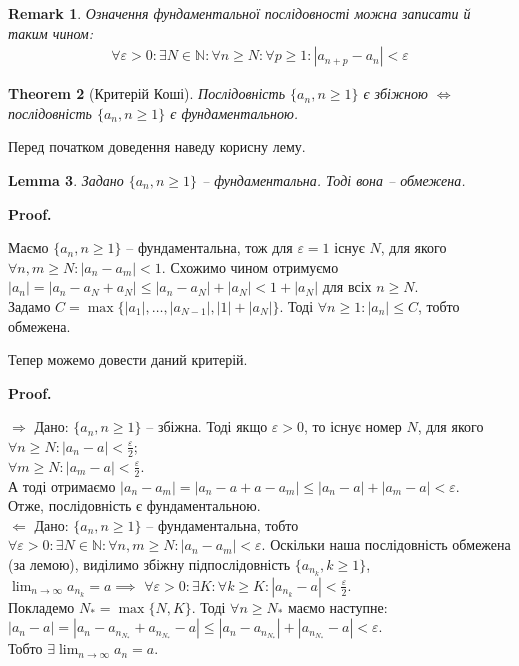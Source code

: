 \documentclass[a4paper, 14pt]{article}
\makeatletter
\def\qed{$\blacksquare$}
\def\rightproof{$\boxed{\Rightarrow}$ }
\def\leftproof{$\boxed{\Leftarrow}$ }
\theoremstyle{theoremdd}
\newtheorem{theorem}{Theorem}[subsection]
\theoremstyle{theoremdd}
\theoremstyle{theoremdd}
\theoremstyle{theoremdd}
\theoremstyle{theoremdd}
\theoremstyle{theoremdd}
\newtheorem{remark}[theorem]{Remark}
\theoremstyle{theoremdd}
\newtheorem{lemma}[theorem]{Lemma}
\theoremstyle{theoremdd}
\renewenvironment{proof}[1][Proof.\\]{\par
\pushQED{\hfill \qed}%
\normalfont \topsep6\p@\@plus6\p@\relax
\trivlist
\item\relax
{\bfseries
#1\@addpunct{.}}\hspace\labelsep\ignorespaces
}{%
\popQED\endtrivlist\@endpefalse
}
\makeatother
\begin{document}
	\begin{remark}
	Означення фундаментальної послідовності можна записати й таким чином:
	\begin{align*}
	\forall \varepsilon > 0: \exists N \in \mathbb{N}: \forall n \geq N: \forall p \geq 1: |a_{n+p} - a_n| < \varepsilon
	\end{align*}
	\end{remark}
	
	\begin{theorem}[Критерій Коші]
	Послідовність $\{a_n, n \geq 1\}$ є збіжною $\iff$ послідовність $\{a_n, n \geq 1\}$ є фундаментальною.
	\end{theorem}
	
	Перед початком доведення наведу корисну лему.
	
	\begin{lemma}
	Задано $\{a_n, n \geq 1\}$ -- фундаментальна. Тоді вона -- обмежена.
	\end{lemma}
	
	\begin{proof}
	Маємо $\{a_n, n \geq 1\}$ -- фундаментальна, тож для $\varepsilon = 1$ існує $N$, для якого $\forall n,m \geq N: |a_n - a_m| < 1$. Схожимо чином отримуємо $|a_n| = |a_n - a_N + a_N| \leq |a_n - a_N| + |a_N| < 1 + |a_N|$ для всіх $n \geq N$.\\
	Задамо $C = \max\{|a_1|, \dots, |a_{N-1}|, |1|+|a_N|\}$. Тоді $\forall n \geq 1: |a_n| \leq C$, тобто обмежена.
	\end{proof}
	
	Тепер можемо довести даний критерій.
	
	\begin{proof}
	\rightproof Дано: $\{a_n,n \geq 1\}$ -- збіжна. Тоді якщо $\varepsilon > 0$, то існує номер $N$, для якого \\
	$\displaystyle \forall n \geq N: |a_n - a| < \frac{\varepsilon}{2}$;\\
	$\displaystyle \forall m \geq N: |a_m - a| < \frac{\varepsilon}{2}$.\\
	А тоді отримаємо $|a_n - a_m| = |a_n - a + a - a_m| \leq |a_n - a| + |a_m - a| < \varepsilon$.\\
	Отже, послідовність є фундаментальною.
	\bigskip \\
	\leftproof Дано: $\{a_n, n \geq 1\}$ -- фундаментальна, тобто $\forall \varepsilon > 0: \exists N \in \mathbb{N}: \forall n,m \geq N: |a_n - a_m| < \varepsilon$. Оскільки наша послідовність обмежена (за лемою), виділимо збіжну підпослідовність $\{a_{n_k}, k \geq 1\}$, \\ $\displaystyle \lim_{n \to \infty} a_{n_k} = a \implies$
	$\displaystyle \forall \varepsilon > 0: \exists K: \forall k \geq K: |a_{n_k} - a| < \frac{\varepsilon}{2}$.\\
	Покладемо $N_* = \max\{N,K\}$. Тоді $\forall n \geq N_*$ маємо наступне: \\
	$|a_n - a| = |a_n - a_{n_{N_*}} + a_{n_{N_*}} - a| \leq |a_n - a_{n_{N_*}}| + |a_{n_{N_*}} - a| < \varepsilon$.\\
	Тобто $\displaystyle \exists \lim_{n \to \infty} a_n = a$.
	\end{proof}
	
\end{document}
